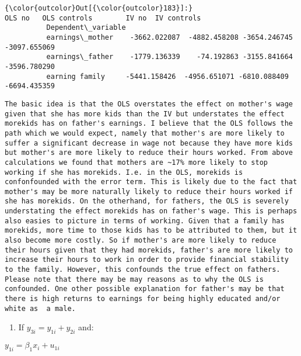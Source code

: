\documentclass[11pt]{article}
\providecommand{\tightlist}{%
      \setlength{\itemsep}{0pt}\setlength{\parskip}{0pt}}
\begin{document}
\begin{Verbatim}[commandchars=\\\{\}]
{\color{outcolor}Out[{\color{outcolor}183}]:}                         OLS no   OLS controls        IV no  IV controls
          Dependent\_variable                                                     
          earnings\_mother    -3662.022087  -4882.458208 -3654.246745 -3097.655069
          earnings\_father    -1779.136339    -74.192863 -3155.841664 -3596.780290
          earning family     -5441.158426  -4956.651071 -6810.088409 -6694.435359
\end{Verbatim}
            
    \begin{verbatim}
The basic idea is that the OLS overstates the effect on mother's wage given that she has more kids than the IV but understates the effect morekids has on father's earnings. I believe that the OLS follows the path which we would expect, namely that mother's are more likely to suffer a significant decrease in wage not because they have more kids but mother's are more likely to reduce their hours worked. From above calculations we found that mothers are ~17% more likely to stop working if she has morekids. I.e. in the OLS, morekids is confonfounded with the error term. This is likely due to the fact that mother's may be more naturally likely to reduce their hours worked if she has morekids. On the otherhand, for fathers, the OLS is severely understating the effect morekids has on father's wage. This is perhaps also easies to picture in terms of working. Given that a family has morekids, more time to those kids has to be attributed to them, but it also become more costly. So if mother's are more likely to reduce their hours given that they had morekids, father's are more likely to increase their hours to work in order to provide financial stability to the family. However, this confounds the true effect on fathers. Please note that there may be may reasons as to why the OLS is confounded. One other possible explanation for father's may be that there is high returns to earnings for being highly educated and/or white as  a male. 
\end{verbatim}

    \begin{enumerate}
\def\labelenumi{\alph{enumi})}
\setcounter{enumi}{1}
\tightlist
\item
  If \(y_{3i} = y_{1i} + y_{2i}\) and:
\end{enumerate}

\(y_{1i} = \beta_1x_i + u_{1i}\)
\end{document}
